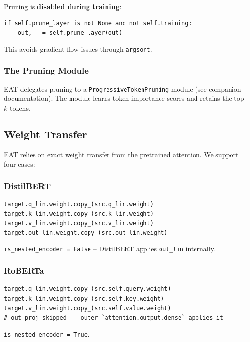 Pruning is \textbf{disabled during training}:

\begin{lstlisting}
if self.prune_layer is not None and not self.training:
    out, _ = self.prune_layer(out)
\end{lstlisting}

This avoids gradient flow issues through \texttt{argsort}.

\subsubsection{The Pruning Module}

EAT delegates pruning to a \texttt{ProgressiveTokenPruning} module (see companion 
documentation). The module learns token importance scores and retains the 
top-$k$ tokens.

\subsection{Weight Transfer}

EAT relies on exact weight transfer from the pretrained attention. We 
support four cases:

\subsubsection{DistilBERT}

\begin{lstlisting}
target.q_lin.weight.copy_(src.q_lin.weight)
target.k_lin.weight.copy_(src.k_lin.weight)
target.v_lin.weight.copy_(src.v_lin.weight)
target.out_lin.weight.copy_(src.out_lin.weight)
\end{lstlisting}

\texttt{is\_nested\_encoder = False} -- DistilBERT applies \texttt{out\_lin} internally.

\subsubsection{RoBERTa}

\begin{lstlisting}
target.q_lin.weight.copy_(src.self.query.weight)
target.k_lin.weight.copy_(src.self.key.weight)
target.v_lin.weight.copy_(src.self.value.weight)
# out_proj skipped -- outer `attention.output.dense` applies it
\end{lstlisting}

\texttt{is\_nested\_encoder = True}.

